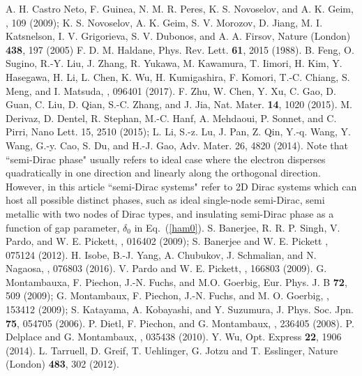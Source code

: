 \documentclass[aps,prb,showpacs,twocolumn,floats]{revtex4-1}
\begin{document}
\begin{thebibliography}{99} 
 A. H. Castro Neto, F. Guinea, N. M. R. Peres, K. S. Novoselov, and A. K. Geim, , 109 (2009); 
K. S. Novoselov, A. K. Geim, S. V. Morozov, D. Jiang, M. I. Katsnelson, I. V. Grigorieva, S. V. Dubonos, and A. A. Firsov, Nature (London) {\bf 438}, 197 (2005)
 F. D. M. Haldane, Phys. Rev. Lett. {\bf 61}, 2015 (1988).
B. Feng, O. Sugino, R.-Y. Liu, J. Zhang, R. Yukawa, M. Kawamura, T. Iimori, H. Kim, Y. Hasegawa, H. Li, L. Chen, K. Wu, H. Kumigashira, F. Komori, T.-C. Chiang, S. Meng, and I. Matsuda, , 096401 (2017).
F. Zhu, W. Chen, Y. Xu, C. Gao, D. Guan, C. Liu, D. Qian, S.-C. Zhang, and J. Jia, Nat. Mater. {\bf 14}, 1020 (2015).
M. Derivaz, D. Dentel, R. Stephan, M.-C. Hanf, A. Mehdaoui, P. Sonnet, and C. Pirri, Nano Lett. 15, 2510 (2015); 
L. Li, S.-z. Lu, J. Pan, Z. Qin, Y.-q. Wang, Y. Wang, G.-y. Cao, S. Du, and H.-J. Gao, Adv. Mater. 26, 4820 (2014).
 Note that ``semi-Dirac phase" usually refers to ideal case where the electron disperses quadratically in one direction and linearly along the orthogonal direction.
However, in this article ``semi-Dirac systems" refer to  2D Dirac systems which can host all possible distinct phases,
such as ideal single-node semi-Dirac, semi metallic with two nodes of Dirac types, and insulating semi-Dirac phase 
as a function of gap parameter, $\delta_0$ in Eq.~(\ref{ham0}).
 S. Banerjee, R. R. P. Singh, V. Pardo, and W. E. Pickett, , 016402 (2009); S. Banerjee and W. E. Pickett , 075124 (2012). 
 H. Isobe, B.-J. Yang, A. Chubukov, J. Schmalian, and N. Nagaosa, , 076803 (2016).
 V. Pardo and W. E. Pickett, , 166803
(2009).
G. Montambauxa, F. Piechon, J.-N. Fuchs, and M.O. Goerbig, Eur. Phys. J. B {\bf 72}, 509 (2009); 
G. Montambaux, F. Piechon, J.-N. Fuchs, and M. O. Goerbig, , 153412  (2009); 
 S. Katayama, A. Kobayashi, and Y. Suzumura, J. Phys. Soc. Jpn. {\bf 75}, 054705 (2006).
 P. Dietl, F. Piechon, and G. Montambaux, ,
236405 (2008).
 P. Delplace and G. Montambaux, , 035438 (2010).
 Y. Wu, Opt. Express {\bf 22}, 1906 (2014).   
L. Tarruell,	D. Greif,	T. Uehlinger,	G. Jotzu	and T. Esslinger, Nature (London) {\bf 483}, 302 (2012).

\end{thebibliography}
\end{document}
